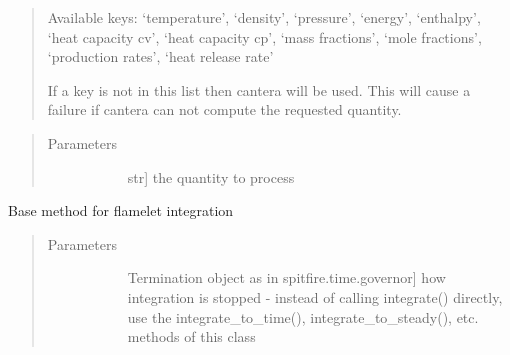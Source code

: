 \documentclass[letterpaper,10pt,english]{sphinxmanual}
\begin{document}
\begin{fulllineitems}
\begin{fulllineitems}
\begin{quote}
Available keys: ‘temperature’, ‘density’, ‘pressure’, ‘energy’, ‘enthalpy’, ‘heat capacity cv’, ‘heat capacity cp’,
‘mass fractions’, ‘mole fractions’, ‘production rates’, ‘heat release rate’

If a key is not in this list then cantera will be used.
This will cause a failure if cantera can not compute the requested quantity.
\end{quote}
\begin{quote}\begin{description}
\item[{Parameters}] \leavevmode\begin{description}
\item[{}] \leavevmode{[}str{]}
the quantity to process

\end{description}

\end{description}\end{quote}

\end{fulllineitems}


\begin{fulllineitems}
\label{\detokenize{spitfire.chemistry.flamelet:spitfire.chemistry.flamelet.Flamelet.integrate}}
Base method for flamelet integration
\begin{quote}\begin{description}
\item[{Parameters}] \leavevmode\begin{description}
\item[{}] \leavevmode{[}Termination object as in spitfire.time.governor{]}
how integration is stopped - instead of calling integrate() directly, use the integrate\_to\_time(), integrate\_to\_steady(), etc. methods of this class


\end{description}
\end{description}
\end{quote}
\end{fulllineitems}
\end{fulllineitems}
\end{document}
